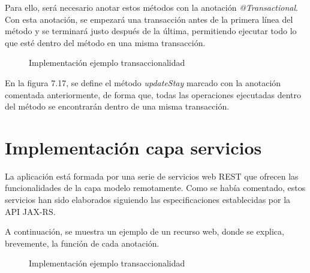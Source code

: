 Para ello, será necesario anotar estos métodos con la anotación \textit{@Transactional}. Con esta anotación, se empezará una transacción antes de la primera línea del método y se terminará justo después de la última, permitiendo ejecutar todo lo que esté dentro del método en una misma transacción.

\begin{figure}[H]
\centering
{}
\caption{Implementación ejemplo transaccionalidad}
\end{figure}

En la figura 7.17, se define el método \textit{updateStay} marcado con la anotación comentada anteriormente, de forma que, todas las operaciones ejecutadas dentro del método se encontrarán dentro de una misma transacción. 


\section{Implementación capa servicios}
La aplicación está formada por una serie de servicios web REST que ofrecen las funcionalidades de la capa modelo remotamente. Como se había comentado, estos servicios han sido elaborados siguiendo las especificaciones establecidas por la API JAX-RS.

A continuación, se muestra un ejemplo de un recurso web, donde se explica, brevemente, la función de cada anotación.


\begin{figure}[H]
\centering
{}
\caption{Implementación ejemplo transaccionalidad}
\end{figure}

